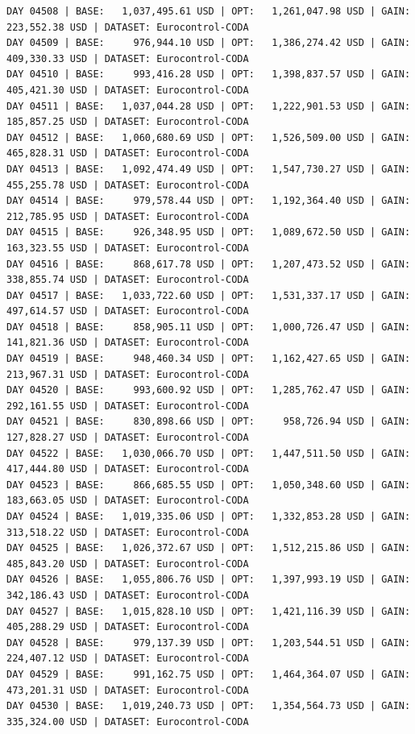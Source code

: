 \documentclass[11pt,a4paper]{article}
\begin{document}
\begin{verbatim}
DAY 04508 | BASE:   1,037,495.61 USD | OPT:   1,261,047.98 USD | GAIN: 223,552.38 USD | DATASET: Eurocontrol-CODA
DAY 04509 | BASE:     976,944.10 USD | OPT:   1,386,274.42 USD | GAIN: 409,330.33 USD | DATASET: Eurocontrol-CODA
DAY 04510 | BASE:     993,416.28 USD | OPT:   1,398,837.57 USD | GAIN: 405,421.30 USD | DATASET: Eurocontrol-CODA
DAY 04511 | BASE:   1,037,044.28 USD | OPT:   1,222,901.53 USD | GAIN: 185,857.25 USD | DATASET: Eurocontrol-CODA
DAY 04512 | BASE:   1,060,680.69 USD | OPT:   1,526,509.00 USD | GAIN: 465,828.31 USD | DATASET: Eurocontrol-CODA
DAY 04513 | BASE:   1,092,474.49 USD | OPT:   1,547,730.27 USD | GAIN: 455,255.78 USD | DATASET: Eurocontrol-CODA
DAY 04514 | BASE:     979,578.44 USD | OPT:   1,192,364.40 USD | GAIN: 212,785.95 USD | DATASET: Eurocontrol-CODA
DAY 04515 | BASE:     926,348.95 USD | OPT:   1,089,672.50 USD | GAIN: 163,323.55 USD | DATASET: Eurocontrol-CODA
DAY 04516 | BASE:     868,617.78 USD | OPT:   1,207,473.52 USD | GAIN: 338,855.74 USD | DATASET: Eurocontrol-CODA
DAY 04517 | BASE:   1,033,722.60 USD | OPT:   1,531,337.17 USD | GAIN: 497,614.57 USD | DATASET: Eurocontrol-CODA
DAY 04518 | BASE:     858,905.11 USD | OPT:   1,000,726.47 USD | GAIN: 141,821.36 USD | DATASET: Eurocontrol-CODA
DAY 04519 | BASE:     948,460.34 USD | OPT:   1,162,427.65 USD | GAIN: 213,967.31 USD | DATASET: Eurocontrol-CODA
DAY 04520 | BASE:     993,600.92 USD | OPT:   1,285,762.47 USD | GAIN: 292,161.55 USD | DATASET: Eurocontrol-CODA
DAY 04521 | BASE:     830,898.66 USD | OPT:     958,726.94 USD | GAIN: 127,828.27 USD | DATASET: Eurocontrol-CODA
DAY 04522 | BASE:   1,030,066.70 USD | OPT:   1,447,511.50 USD | GAIN: 417,444.80 USD | DATASET: Eurocontrol-CODA
DAY 04523 | BASE:     866,685.55 USD | OPT:   1,050,348.60 USD | GAIN: 183,663.05 USD | DATASET: Eurocontrol-CODA
DAY 04524 | BASE:   1,019,335.06 USD | OPT:   1,332,853.28 USD | GAIN: 313,518.22 USD | DATASET: Eurocontrol-CODA
DAY 04525 | BASE:   1,026,372.67 USD | OPT:   1,512,215.86 USD | GAIN: 485,843.20 USD | DATASET: Eurocontrol-CODA
DAY 04526 | BASE:   1,055,806.76 USD | OPT:   1,397,993.19 USD | GAIN: 342,186.43 USD | DATASET: Eurocontrol-CODA
DAY 04527 | BASE:   1,015,828.10 USD | OPT:   1,421,116.39 USD | GAIN: 405,288.29 USD | DATASET: Eurocontrol-CODA
DAY 04528 | BASE:     979,137.39 USD | OPT:   1,203,544.51 USD | GAIN: 224,407.12 USD | DATASET: Eurocontrol-CODA
DAY 04529 | BASE:     991,162.75 USD | OPT:   1,464,364.07 USD | GAIN: 473,201.31 USD | DATASET: Eurocontrol-CODA
DAY 04530 | BASE:   1,019,240.73 USD | OPT:   1,354,564.73 USD | GAIN: 335,324.00 USD | DATASET: Eurocontrol-CODA

\end{verbatim}
\end{document}
